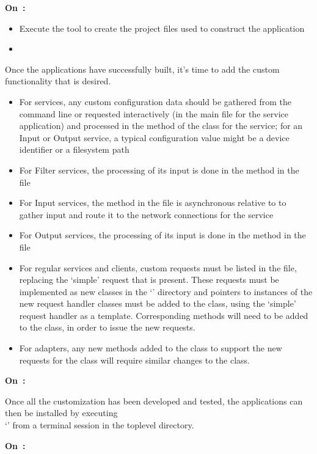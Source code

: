 \begin{center}\textbf{On~\win:}\end{center}
\begin{itemize}
\item Execute the tool  to create the project files used to construct the
application
\item\exSp\TBD
\end{itemize}
\tertiaryEnd
{}
Once the applications have successfully built, it's time to add the custom functionality
that is desired.
\begin{itemize}
\item For  services, any custom configuration data should be gathered from
the command line or requested interactively (in the main file for the service
application) and processed in the  method of the class for the service;
for an Input or Output service, a typical configuration value might be a device
identifier or a file\longDash{}system path
\item\exSp{}For Filter services, the processing of its input is done in the
 method in the\\
 file
\item\exSp{}For Input services, the  method in the
 file is asynchronous \longDash{} relative to \mplusm{}
\longDash{} to gather input and route it to the \yarp{} network connections for the
service
\item\exSp{}For Output services, the processing of its input is done in the
 method in the\\
 file
\item\exSp{}For regular services and clients, custom requests must be listed in the
 file, replacing the `simple' request that is present.
These requests must be implemented as new classes in the `' directory
and pointers to instances of the new request handler classes must be added to the
 class, using the `simple' request handler as a template.
Corresponding methods will need to be added to the  class, in order to
issue the new requests.
\item\exSp{}For adapters, any new methods added to the  class to
support the new requests for the  class will require similar changes to
the  class.
\end{itemize}
\tertiaryEnd
{}
\begin{center}\textbf{On~\osx:}\end{center}
Once all the customization has been developed and tested, the applications can then be
installed by executing\\
`' from a terminal session in the top\longDash{}level directory.
\begin{center}\textbf{On~\win:}\end{center}
\TBD
\tertiaryEnd
\secondaryEnd
\appendixEnd{}
